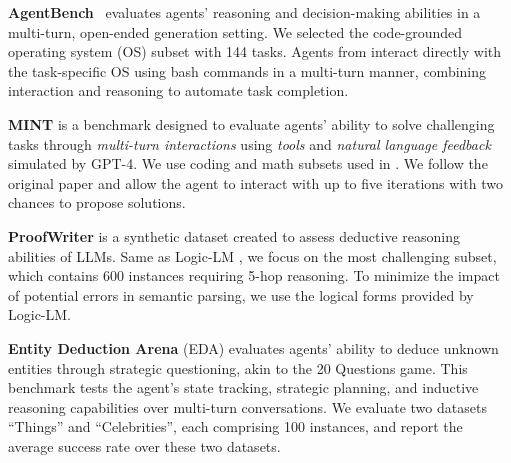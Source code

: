 \textbf{AgentBench}~\citep{liu2023agentbench} evaluates agents' reasoning and decision-making abilities in a multi-turn, open-ended generation setting.
We selected the code-grounded operating system (OS) subset with 144 tasks.
Agents from \projname interact directly with the task-specific OS using bash commands in a multi-turn manner, combining interaction and reasoning to automate task completion.

\textbf{MINT} \citep{wang2024mint} is a benchmark designed to evaluate agents' ability to solve challenging tasks through \textit{multi-turn interactions} using \textit{tools} and \textit{natural language feedback} simulated by GPT-4. We use coding and math subsets used in \citet{yuan2024advancing}. We follow the original paper and allow the agent to interact with up to five iterations with two chances to propose solutions.

\textbf{ProofWriter} \citep{proofwriter} is a synthetic dataset created to assess deductive reasoning abilities of LLMs.
Same as Logic-LM \citep{logic_lm}, we focus on the most challenging subset, which contains 600 instances requiring 5-hop reasoning. To minimize the impact of potential errors in semantic parsing, we use the logical forms provided by Logic-LM.


\textbf{Entity Deduction Arena} (EDA) \citep{zhang2023entity} evaluates agents' ability to deduce unknown entities through strategic questioning, akin to the 20 Questions game. 
This benchmark tests the agent's state tracking, strategic planning, and inductive reasoning capabilities over multi-turn conversations. We evaluate two datasets ``Things'' and ``Celebrities'', each comprising 100 instances, and report the average success rate over these two datasets.
